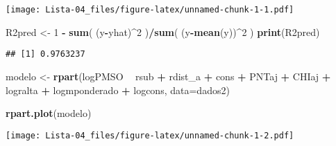 \documentclass[
]{article}
\newenvironment{Shaded}{\begin{snugshade}}{\end{snugshade}}
\newcommand{\DataTypeTok}[1]{\textcolor[rgb]{0.13,0.29,0.53}{#1}}
\newcommand{\DecValTok}[1]{\textcolor[rgb]{0.00,0.00,0.81}{#1}}
\newcommand{\KeywordTok}[1]{\textcolor[rgb]{0.13,0.29,0.53}{\textbf{#1}}}
\newcommand{\NormalTok}[1]{#1}
\newcommand{\OperatorTok}[1]{\textcolor[rgb]{0.81,0.36,0.00}{\textbf{#1}}}
\newcommand{\StringTok}[1]{\textcolor[rgb]{0.31,0.60,0.02}{#1}}
\begin{document}
\texttt{[image: Lista-04\_files/figure-latex/unnamed-chunk-1-1.pdf]}

\begin{Shaded}
\begin{Highlighting}[]
\NormalTok{R2pred <-}\StringTok{ }\DecValTok{1} \OperatorTok{-}\StringTok{ }\KeywordTok{sum}\NormalTok{( (y}\OperatorTok{-}\NormalTok{yhat)}\OperatorTok{^}\DecValTok{2}\NormalTok{ )}\OperatorTok{/}\KeywordTok{sum}\NormalTok{( (y}\OperatorTok{-}\KeywordTok{mean}\NormalTok{(y))}\OperatorTok{^}\DecValTok{2}\NormalTok{ )}
\KeywordTok{print}\NormalTok{(R2pred)}
\end{Highlighting}
\end{Shaded}

\begin{verbatim}
## [1] 0.9763237
\end{verbatim}

\begin{Shaded}
\begin{Highlighting}[]
\NormalTok{modelo <-}\StringTok{ }\KeywordTok{rpart}\NormalTok{(logPMSO }\OperatorTok{~}\StringTok{ }\NormalTok{rsub }\OperatorTok{+}\StringTok{ }\NormalTok{rdist_a }\OperatorTok{+}\StringTok{ }\NormalTok{cons }\OperatorTok{+}\StringTok{ }\NormalTok{PNTaj }\OperatorTok{+}\StringTok{ }\NormalTok{CHIaj }\OperatorTok{+}\StringTok{ }\NormalTok{logralta }\OperatorTok{+}\StringTok{ }\NormalTok{logmponderado }\OperatorTok{+}\StringTok{ }\NormalTok{logcons, }\DataTypeTok{data=}\NormalTok{dados2)}
 
\KeywordTok{rpart.plot}\NormalTok{(modelo)}
\end{Highlighting}
\end{Shaded}

\texttt{[image: Lista-04\_files/figure-latex/unnamed-chunk-1-2.pdf]}
\end{document}
